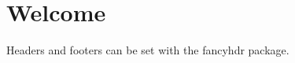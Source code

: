 \documentclass{article}
\begin{document}
\tableofcontents
\newpage


\section{Welcome}
Headers and footers can be set with the fancyhdr package.
\end{document}
